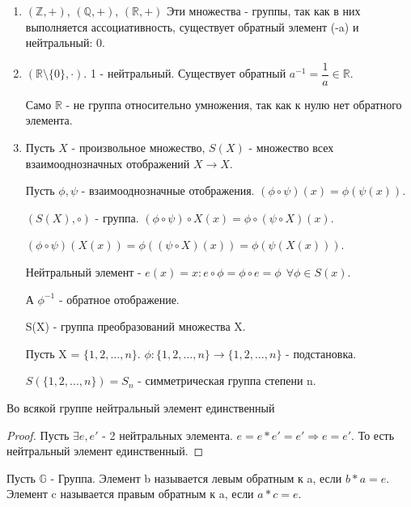 \begin{example}
	\begin{enumerate}
		\item \((\mathbb{Z}, +)\), \((\mathbb{Q}, +)\), \((\mathbb{R}, +)\)
		Эти множества - группы, так как в них выполняется ассоциативность, существует обратный элемент (-a) и нейтральный: 0.
		
		\item \((\mathbb{R}\setminus\{0\}, \cdot)\). 1 - нейтральный. Существует обратный \(a^{-1} = \dfrac{1}{a}\in\mathbb{R}\). 
		\begin{note} Само \(\mathbb{R}\) - не группа относительно умножения, так как к нулю нет обратного элемента.\end{note}
		
		\item Пусть \(X\) - произвольное множество, \(S(X)\) - множество всех взаимооднозначных отображений \(X\to X\). 
		
		Пусть \(\phi, \psi\) - взаимооднозначные отображения. \((\phi\circ\psi)(x) = \phi(\psi(x))\). 
		
		\((S(X), \circ)\) - группа. \((\phi\circ\psi)\circ X(x) = \phi\circ(\psi\circ X)(x)\). 
		
		\((\phi\circ\psi)(X(x)) = \phi((\psi\circ X)(x)) = \phi(\psi(X(x)))\). 
		
		Нейтральный элемент - \(e(x) = x: e\circ\phi = \phi\circ e = \phi \: \: \forall \phi\in S(x)\).
		
		А \(\phi^{-1}\) - обратное отображение.
		
		S(X) - группа преобразований множества X.

		\begin{definition} 
			Пусть X = \(\{1, 2,\ldots, n\}\). \(\phi:\{1,2,\ldots, n\}\to\{1,2,\ldots, n\}\) - подстановка. 
			
			\(S(\{1,2,\ldots, n\}) = S_n\) - симметрическая группа степени n. 
		\end{definition}

	\end{enumerate}
\end{example}
\begin{proposition}
	Во всякой группе нейтральный элемент единственный
\end{proposition}
\begin{proof}
	Пусть \(\exists e, e'\) - 2 нейтральных элемента. \(e = e*e' = e' \Longrightarrow e = e'\). То есть нейтральный элемент единственный.
\end{proof}
\begin{definition}
	Пусть \(\mathbb{G}\) - Группа. Элемент b называется левым обратным к a, если \(b*a = e\). Элемент c называется правым обратным к a, если \(a*c = e\).
\end{definition}
